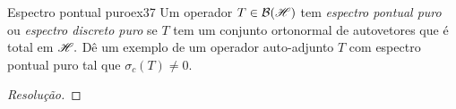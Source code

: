 \begin{exercício}{Espectro pontual puro}{ex37}
  Um operador \(T \in \mathcal{B}(\mathscr{H})\) tem \emph{espectro pontual puro} ou \emph{espectro discreto puro} se \(T\) tem um conjunto ortonormal de autovetores que é total em \(\mathscr{H}.\) Dê um exemplo de um operador auto-adjunto \(T\) com espectro pontual puro tal que \(\sigma_c(T) \neq 0.\)
\end{exercício}
\begin{proof}[Resolução]

\end{proof}
